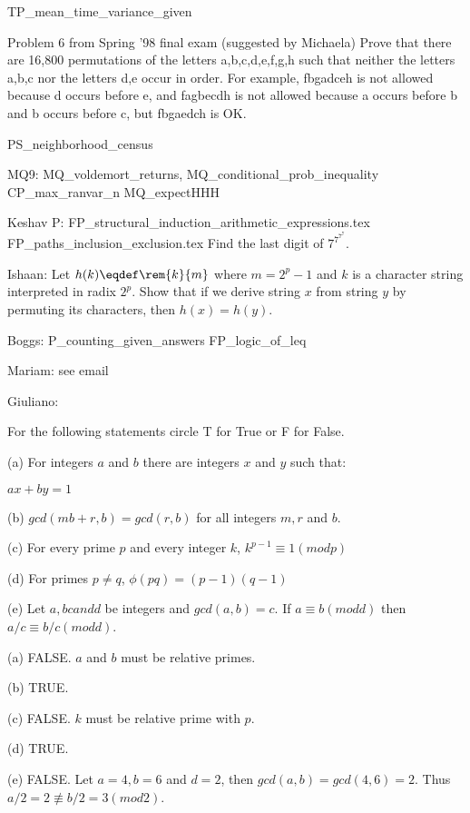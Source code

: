 TP\_mean\_time\_variance\_given

Problem 6 from Spring '98 final exam (suggested by Michaela)
  Prove that there are 16,800 permutations of the letters
  {a,b,c,d,e,f,g,h} such that neither the letters {a,b,c} nor the
  letters {d,e} occur in order. For example, fbgadceh is not allowed
  because d occurs before e, and fagbecdh is not allowed because a
  occurs before b and b occurs before c, but fbgaedch is OK.

PS\_neighborhood\_census

MQ9:
MQ\_voldemort\_returns,
MQ\_conditional\_prob\_inequality
CP\_max\_ranvar\_n
MQ\_expectHHH

Keshav P:
FP\_structural\_induction\_arithmetic\_expressions.tex
FP\_paths\_inclusion\_exclusion.tex
Find the last digit of $7^7^7^7$.

Ishaan: Let $h(k) \eqdef \rem{k}{m}$ where $m = 2^p - 1$ and $k$ is a
character string interpreted in radix $2^p$.  Show that if we derive
string $x$ from string $y$ by permuting its characters, then $h(x) = h(y)$.

Boggs:
P_counting_given_answers
FP_logic_of_leq

Mariam: see email

Giuliano:
\begin{problem}
For the following statements circle T for True or F for False.

(a) For integers $a$ and $b$ there are integers $x$ and $y$ such that:

$ax + by = 1$

(b) $gcd(mb+r, b) = gcd(r,b)$ for all integers $m,r$ and $b$.

(c) For every prime $p$ and every integer $k$, $k^{p-1} \equiv 1 (mod p)$

(d) For primes $p \not= q$, $\phi(pq) = (p-1)(q-1)$

(e) Let $a,b c and d$ be integers and $gcd(a,b) = c$. If $a \equiv b (mod d)$ then $ a/c \equiv b/c (mod d)$.

\begin{solution}

(a) FALSE. $a$ and $b$ must be relative primes.

(b) TRUE.

(c) FALSE. $k$ must be relative prime with $p$.

(d) TRUE.

(e) FALSE. Let $a=4, b=6$ and $d=2$, then $gcd(a,b) = gcd(4,6)
=2$. Thus  $a/2 = 2 \not\equiv b/2 = 3 (mod 2)$.

\end{solution}
\end{problem}

